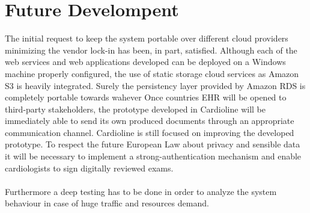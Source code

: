 \section{Future Develompent}
The initial request to keep the system portable over different cloud providers minimizing the vendor lock-in has been, in part, satisfied. Although each of the web services and web applications developed can be deployed on a Windows machine properly configured, the use of static storage cloud services as Amazon S3 is heavily integrated. Surely the persistency layer provided by Amazon RDS is completely portable towards wahever 
Once countries EHR will be opened to third-party stakeholders, the prototype developed in Cardioline will be immediately able to send its own produced documents through an appropriate communication channel.
Cardioline is still focused on improving the developed prototype. To respect the future European Law about privacy and sensible data it will be necessary to implement a strong-authentication mechanism and enable cardiologists to sign digitally reviewed exams.\\ \\
Furthermore a deep testing has to be done in order to analyze the system behaviour in case of huge traffic and resources demand.\\ \\
